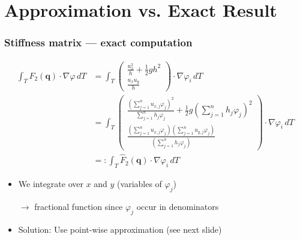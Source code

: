 \documentclass{beamer}
\renewcommand{\phi}{\varphi}
\begin{document}
\section{Approximation vs. Exact Result}
\label{sec:stiffness-exact-approx}

\begin{frame}
  \frametitle{Stiffness matrix --- exact computation}
  \begin{align*}
    \int_T F_2(\mathbf{q}) \cdot \nabla \phi \, dT & =
    \int_T
    \begin{pmatrix}
      \frac{u_x^2}{h} + \frac{1}{2} g h^2 \\ \frac{u_x u_y}{h}
    \end{pmatrix}
    \cdot \nabla \phi_i \, dT \\
    & =
    \int_T
    \begin{pmatrix}
      \frac{\left(\sum_{j=1}^n u_{x,j} \phi_j \right)^2}{\sum_{j=1}^n h_j \phi_j} + \frac{1}{2} g \left( \sum_{j=1}^n h_j \phi_j \right)^2 \\ \frac{\left( \sum_{j=1}^n u_{x,j} \phi_j \right) \left( \sum_{j=1}^n u_{y,j} \phi_j \right)}{\left( \sum_{j=1}^n h_{j} \phi_j \right)}
    \end{pmatrix}
    \cdot \nabla \phi_i \, dT \\
    & =: \int_T \widehat{F}_2(\mathbf{q}) \cdot \nabla \phi_i \,dT
  \end{align*}
  \begin{itemize}
  \item We integrate over $x$ and $y$ (variables of $\phi_j$)

    $\rightarrow$ fractional function since $\phi_j$ occur in denominators
  \item Solution: Use point-wise approximation (see next slide)
  \end{itemize}
\end{frame}
\end{document}
